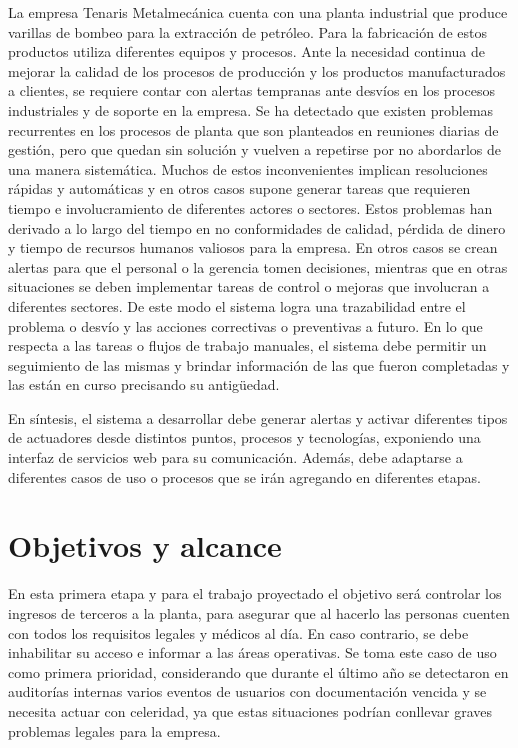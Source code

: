 La empresa Tenaris Metalmecánica cuenta con una planta industrial que produce varillas de bombeo para la extracción de petróleo. Para la fabricación de estos productos utiliza diferentes equipos y procesos. Ante la necesidad continua de mejorar la calidad de los procesos de producción y los productos manufacturados a clientes, se requiere contar con alertas tempranas ante desvíos en los procesos industriales y de soporte en la empresa. Se ha detectado que existen problemas recurrentes en los procesos de planta que son planteados en reuniones diarias de gestión, pero que quedan sin solución y vuelven a
repetirse por no abordarlos de una manera sistemática. Muchos de estos inconvenientes implican resoluciones rápidas y automáticas y en otros casos supone generar tareas que requieren tiempo e involucramiento de diferentes actores o sectores. Estos problemas han derivado a lo largo del tiempo en no conformidades de calidad, pérdida de dinero y tiempo de recursos humanos valiosos para la empresa. En otros casos se crean alertas para que el personal o la gerencia tomen decisiones, mientras que en otras situaciones se deben implementar tareas de control o mejoras que involucran a diferentes sectores. De este modo el sistema logra una trazabilidad entre el problema o desvío y las acciones correctivas o preventivas a futuro. En lo que respecta a las tareas o flujos de trabajo manuales, el sistema debe permitir un seguimiento de las mismas y brindar información de las que fueron completadas y las están en curso precisando su antigüedad.

En síntesis, el sistema a desarrollar debe generar alertas y activar diferentes tipos de actuadores desde distintos puntos, procesos y tecnologías, exponiendo una interfaz de servicios web para su comunicación. Además, debe adaptarse a diferentes casos de uso o procesos que se irán agregando en diferentes etapas.


\section{Objetivos y alcance}

En esta primera etapa y para el trabajo proyectado el objetivo será controlar los ingresos de terceros a la planta, para asegurar que al hacerlo las personas cuenten con todos los requisitos legales y médicos al día. En caso contrario, se debe inhabilitar su acceso e informar a las áreas operativas. Se toma este caso de uso como primera prioridad, considerando que durante el último año se detectaron en auditorías internas varios eventos de usuarios con documentación vencida y se necesita actuar con celeridad, ya que estas situaciones podrían conllevar graves problemas legales para la empresa.

